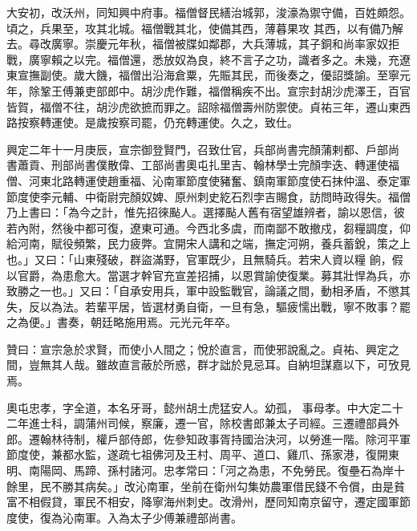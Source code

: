 \begin{pinyinscope}
 大安初，改沃州，同知興中府事。福僧督民繕治城郭，浚濠為禦守備，百姓頗怨。頃之，兵果至，攻其北城。福僧戰其北，使備其西，薄暮果攻
 其西，以有備乃解去。尋改廣寧。崇慶元年秋，福僧被牒如鄰郡，大兵薄城，其子銅和尚率家奴拒戰，廣寧賴之以完。福僧還，悉放奴為良，終不言子之功，識者多之。未幾，充遼東宣撫副使。歲大饑，福僧出沿海倉粟，先賑其民，而後奏之，優詔獎諭。至寧元年，除鞏王傅兼吏部郎中。胡沙虎作難，福僧稱疾不出。宣宗封胡沙虎澤王，百官皆賀，福僧不往，胡沙虎欲摭而罪之。詔除福僧壽州防禦使。貞祐三年，遷山東西路按察轉運使。是歲按察司罷，仍充轉運使。久之，致仕。



 興定二年十一月庚辰，宣宗御登賢門，召致仕官，兵部尚書完顏蒲剌都、戶部尚
 書蕭貢、刑部尚書僕散偉、工部尚書奧屯扎里吉、翰林學士完顏孛迭、轉運使福僧、河東北路轉運使趙重福、沁南軍節度使豬奮、鎮南軍節度使石抹仲溫、泰定軍節度使李元輔、中衛尉完顏奴婢、原州刺史紇石烈孛吉賜食，訪問時政得失。福僧乃上書曰：「為今之計，惟先招徠颭人。選擇颭人舊有宿望雄辨者，諭以恩信，彼若內附，然後中都可復，遼東可通。今西北多虞，而南鄙不敢撤戍，芻糧調度，仰給河南，賦役頻繁，民力疲弊。宜開宋人講和之端，撫定河朔，養兵蓄銳，策之上也。」又曰：「山東殘破，群盜滿野，官軍既少，且無騎兵。若宋人資以糧
 餉，假以官爵，為患愈大。當選才幹官充宣差招捕，以恩賞諭使復業。募其壯悍為兵，亦致勝之一也。」又曰：「自承安用兵，軍中設監戰官，論議之間，動相矛盾，不懲其失，反以為法。若輩平居，皆選材勇自衛，一旦有急，驅疲懦出戰，寧不敗事？罷之為便。」書奏，朝廷略施用焉。元光元年卒。



 贊曰：宣宗急於求賢，而使小人間之；悅於直言，而使邪說亂之。貞祐、興定之間，豈無其人哉。雖故直言蔽於所惑，群才詘於見忌耳。自納坦謀嘉以下，可攷見焉。



 奧屯忠孝，字全道，本名牙哥，懿州胡土虎猛安人。幼孤，
 事母孝。中大定二十二年進士科，調蒲州司候，察廉，遷一官，除校書郎兼太子司經。三遷禮部員外郎。遷翰林待制，權戶部侍郎，佐參知政事胥持國治決河，以勞進一階。除河平軍節度使，兼都水監，遂疏七祖佛河及王村、周平、道口、雞爪、孫家港，復開東明、南陽岡、馬蹄、孫村諸河。忠孝常曰：「河之為患，不免勞民。復壘石為岸十餘里，民不勝其病矣。」改沁南軍，坐前在衛州勾集妨農軍借民錢不令償，由是貧富不相假貸，軍民不相安，降寧海州刺史。改滑州，歷同知南京留守，遷定國軍節度使，復為沁南軍。入為太子少傅兼禮部尚書。




\end{pinyinscope}
